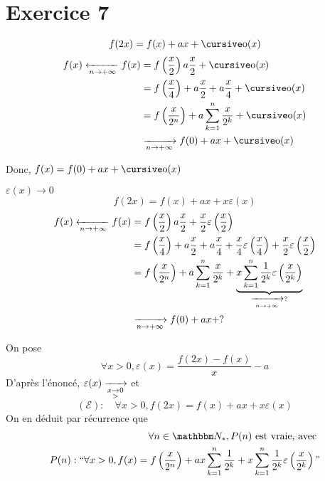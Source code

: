 \part{Exercice 7}


\[
	f(2x) = f(x) + ax + \po(x)
\]
\begin{align*}
	f(x) \xleftarrow[n \to +\infty]{} f(x)
	&= f\left( \frac{x}{2} \right) a\frac{x}{2} + \po(x)\\
	&= f\left( \frac{x}{4} \right) + a \frac{x}{2} + a \frac{x}{4} + \po(x) \\
	&= f\left( \frac{x}{2^n} \right) + a\sum_{k = 1}^n \frac{x}{2^k} + \po(x) \\
	&\tendsto{n\to +\infty} f(0) + ax + \po(x)
\end{align*}

Donc, $f(x) = f(0) + ax + \po(x)$


$\varepsilon(x) \to 0$
\[
	f(2x) = f(x) + ax + x\varepsilon(x)
\]
\begin{align*}
	f(x) \xleftarrow[n \to +\infty]{} f(x)
	&= f\left( \frac{x}{2} \right) a\frac{x}{2} + \frac{x}{2}\varepsilon\left( \frac{x}{2} \right) \\
	&= f\left( \frac{x}{4} \right) + a \frac{x}{2} + a \frac{x}{4} + \frac{x}{4}\varepsilon\left( \frac{x}{4} \right) + \frac{x}{2} \varepsilon\left( \frac{x}{2} \right) \\
	&= f\left( \frac{x}{2^n} \right) + a\sum_{k = 1}^n \frac{x}{2^k} + \underbrace{x\sum_{k = 1}^n \frac{1}{2^k} \varepsilon\left( \frac{x}{2^k} \right)}_{\xrightarrow[n\to +\infty]{} ?}\\
	&\xrightarrow[n\to +\infty]{} f(0) + ax + ?
\end{align*}

On pose \[
	\forall x >0,  \varepsilon(x) = \frac{f(2x) - f(x)}{x}-a
\] D'après l'énoncé, $\varepsilon(x) \xrightarrow[\substack{x \to 0\\>}]{}$ et \[
	(\mathcal{E}):\quad \forall x > 0, f(2x) = f(x) + ax + x\varepsilon(x)
\] On en déduit par récurrence que
\begin{align*}
	\forall n \in \N_*, P(n) \text{ est vraie, avec }\\
	P(n): ``\forall x > 0, f(x) = f\left( \frac{x}{2^n} \right) + ax \sum_{k=1}^n \frac{1}{2^k} + x\sum_{k=1}^n \frac{1}{2^k} \varepsilon\left( \frac{x}{2^k} \right)"
\end{align*}

